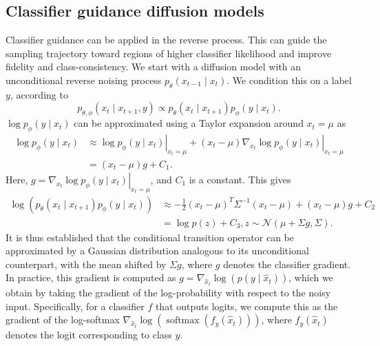 \documentclass{article}
\begin{document}
\subsection{Classifier guidance diffusion models}


Classifier guidance \cite{dhariwal2021diffusion} can be applied in the reverse process. This can guide the sampling trajectory toward regions of higher classifier likelihood and improve fidelity and class-consistency. We start with a diffusion model with an unconditional reverse noising process $ p_\theta\left(x_{t-1} \mid x_t\right)$. We
condition this on a label $y$, according to 
\begin{equation}
    p_{\theta, \phi}\left(x_t \mid x_{t+1}, y\right) \propto  p_\theta\left(x_t \mid x_{t+1}\right) p_\phi\left(y \mid x_t\right).
\end{equation}
$\log p_\phi\left(y \mid x_t\right)$ can be approximated using a Taylor expansion around $x_t = \mu$ as
\begin{equation}
    \begin{aligned}
\log p_\phi\left(y \mid x_t\right) & \left.\approx \log p_\phi\left(y \mid x_t\right)\right|_{x_t=\mu}+\left.\left(x_t-\mu\right) \nabla_{x_t} \log p_\phi\left(y \mid x_t\right)\right|_{x_t=\mu} \\
& =\left(x_t-\mu\right) g+C_1.
\end{aligned}
\end{equation}
Here, $g = \left. \nabla_{x_t} \log p_\phi\left(y \mid x_t\right)\right|_{x_t=\mu}$, and $C_1$ is a constant. This gives 
\begin{equation}
\label{noise_term}
    \begin{aligned}
\log \left(p_\theta\left(x_t \mid x_{t+1}\right) p_\phi\left(y \mid x_t\right)\right) & \approx-\frac{1}{2}\left(x_t-\mu\right)^T \Sigma^{-1}\left(x_t-\mu\right)+\left(x_t-\mu\right) g+C_2 \\
& =\log p(z)+C_3, z \sim \mathcal{N}(\mu+\Sigma g, \Sigma).
\end{aligned}
\end{equation}
It is thus established that the conditional transition operator can be approximated by a Gaussian distribution analogous to its unconditional counterpart, with the mean shifted by $\Sigma g$, where $g$ denotes the classifier gradient. In practice, this gradient is computed as $g = \nabla_{\widehat{x}_t} \log \left(p\left(y \mid \widehat{x}_t\right)\right)$, which we obtain by taking the gradient of the log-probability with respect to the noisy input. Specifically, for a classifier $f$ that outputs logits, we compute this as the gradient of the log-softmax $\nabla_{\widehat{x}_t} \log \left(\operatorname{softmax}\left(f_y\left(\widehat{x}_t\right)\right)\right)$, where $f_y\left(\widehat{x}_t\right)$ denotes the logit corresponding to class $y$.
\end{document}
